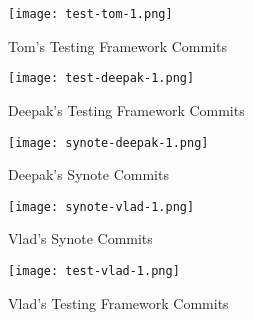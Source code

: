 \begin{figure}[!hbt]
  	\centering
 	\texttt{[image: test-tom-1.png]}
  	\caption{Tom's Testing Framework Commits}
 	\label{fig:tom-testing-commits}
\end{figure}

\begin{figure}[!hbt]
  	\centering
 	\texttt{[image: test-deepak-1.png]}
  	\caption{Deepak's Testing Framework Commits}
 	\label{fig:deepak-testing-commits}
\end{figure}

\begin{figure}[!hbt]
  	\centering
 	\texttt{[image: synote-deepak-1.png]}
  	\caption{Deepak's Synote Commits}
 	\label{fig:deepak-synote-commits}
\end{figure}

\begin{figure}[!hbt]
  	\centering
 	\texttt{[image: synote-vlad-1.png]}
  	\caption{Vlad's Synote Commits}
 	\label{fig:vlad-synote-commits}
\end{figure}

\begin{figure}[!hbt]
  	\centering
 	\texttt{[image: test-vlad-1.png]}
  	\caption{Vlad's Testing Framework Commits}
 	\label{fig:vlad-testing-commits}
\end{figure}